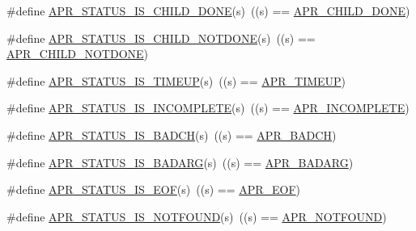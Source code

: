 \begin{DoxyCompactItemize}
\item 
\#define \hyperlink{group___a_p_r___s_t_a_t_u_s___i_s_ga1e6539dfa172cef4026105ca33b2b208}{A\-P\-R\-\_\-\-S\-T\-A\-T\-U\-S\-\_\-\-I\-S\-\_\-\-C\-H\-I\-L\-D\-\_\-\-D\-O\-N\-E}(s)~((s) == \hyperlink{group___a_p_r___error_ga2a78375cab66b8c1a4e06329e0cfcaf4}{A\-P\-R\-\_\-\-C\-H\-I\-L\-D\-\_\-\-D\-O\-N\-E})
\item 
\#define \hyperlink{group___a_p_r___s_t_a_t_u_s___i_s_ga86190a4a2c04bbbbedc2491bb93ab432}{A\-P\-R\-\_\-\-S\-T\-A\-T\-U\-S\-\_\-\-I\-S\-\_\-\-C\-H\-I\-L\-D\-\_\-\-N\-O\-T\-D\-O\-N\-E}(s)~((s) == \hyperlink{group___a_p_r___error_ga00bba31c29774cce3e72a31f88610340}{A\-P\-R\-\_\-\-C\-H\-I\-L\-D\-\_\-\-N\-O\-T\-D\-O\-N\-E})
\item 
\#define \hyperlink{group___a_p_r___s_t_a_t_u_s___i_s_ga864b207719c86ac4deeba696943262d0}{A\-P\-R\-\_\-\-S\-T\-A\-T\-U\-S\-\_\-\-I\-S\-\_\-\-T\-I\-M\-E\-U\-P}(s)~((s) == \hyperlink{group___a_p_r___error_ga9ac087c25ffb0d3bb4d75bee36709853}{A\-P\-R\-\_\-\-T\-I\-M\-E\-U\-P})
\item 
\#define \hyperlink{group___a_p_r___s_t_a_t_u_s___i_s_ga8385878e572abf0b2f78a0ab7d1bc8a5}{A\-P\-R\-\_\-\-S\-T\-A\-T\-U\-S\-\_\-\-I\-S\-\_\-\-I\-N\-C\-O\-M\-P\-L\-E\-T\-E}(s)~((s) == \hyperlink{group___a_p_r___error_ga64dff43b83bcefd3f3c751be6b864ca1}{A\-P\-R\-\_\-\-I\-N\-C\-O\-M\-P\-L\-E\-T\-E})
\item 
\#define \hyperlink{group___a_p_r___s_t_a_t_u_s___i_s_ga20308232897ebff445dc10d0b69a0be2}{A\-P\-R\-\_\-\-S\-T\-A\-T\-U\-S\-\_\-\-I\-S\-\_\-\-B\-A\-D\-C\-H}(s)~((s) == \hyperlink{group___a_p_r___error_ga6f3ca71069880d9fe5678687a257d616}{A\-P\-R\-\_\-\-B\-A\-D\-C\-H})
\item 
\#define \hyperlink{group___a_p_r___s_t_a_t_u_s___i_s_ga88b31c127ad48d12353d175926913cb3}{A\-P\-R\-\_\-\-S\-T\-A\-T\-U\-S\-\_\-\-I\-S\-\_\-\-B\-A\-D\-A\-R\-G}(s)~((s) == \hyperlink{group___a_p_r___error_ga771bf48ab38d93355be8530f6efe4ae9}{A\-P\-R\-\_\-\-B\-A\-D\-A\-R\-G})
\item 
\#define \hyperlink{group___a_p_r___s_t_a_t_u_s___i_s_gaf4232cd96b47b76aec9607b1a78e694f}{A\-P\-R\-\_\-\-S\-T\-A\-T\-U\-S\-\_\-\-I\-S\-\_\-\-E\-O\-F}(s)~((s) == \hyperlink{group___a_p_r___error_ga35d9dca2514c522a2840aca0f3e2ebd3}{A\-P\-R\-\_\-\-E\-O\-F})
\item 
\#define \hyperlink{group___a_p_r___s_t_a_t_u_s___i_s_ga51bc0a0e249f5d09dba3ed9dc02c49e5}{A\-P\-R\-\_\-\-S\-T\-A\-T\-U\-S\-\_\-\-I\-S\-\_\-\-N\-O\-T\-F\-O\-U\-N\-D}(s)~((s) == \hyperlink{group___a_p_r___error_ga9bd83273ff02f31f71fb4dc6f29df4a9}{A\-P\-R\-\_\-\-N\-O\-T\-F\-O\-U\-N\-D})

\end{DoxyCompactItemize}

